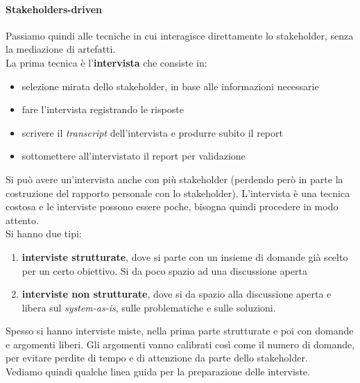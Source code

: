 \documentclass[a4paper,12pt, oneside]{book}
\begin{document}
\paragraph{Stakeholders-driven}
Passiamo quindi alle tecniche in cui interagisce direttamente lo stakeholder,
senza la mediazione di artefatti.\\
La prima tecnica è l'\textbf{intervista} che consiste in:
\begin{itemize}
  \item selezione mirata dello stakeholder, in base alle informazioni necessarie
  \item fare l'intervista registrando le risposte
  \item scrivere il \textit{transcript} dell'intervista e produrre subito il
  report
  \item sottomettere all'intervistato il report per validazione
\end{itemize}
Si può avere un'intervista anche con più stakeholder (perdendo però in parte la
costruzione del rapporto personale con lo stakeholder). L'intervista è una
tecnica costosa e le interviste possono essere poche, bisogna quindi procedere
in modo attento.\\
Si hanno due tipi:
\begin{enumerate}
  \item \textbf{interviste strutturate}, dove si parte con un insieme di domande
  già scelto per un certo obiettivo. Si da poco spazio ad una discussione aperta
  \item \textbf{interviste non strutturate}, dove si da spazio alla discussione
  aperta e libera sul \textit{system-as-is}, sulle problematiche e sulle
  soluzioni. 
\end{enumerate}
Spesso si hanno interviste miste, nella prima parte strutturate e poi con
domande e argomenti liberi. Gli argomenti vanno calibrati così come il numero di
domande, per evitare perdite di tempo e di attenzione da parte dello
stakeholder.\\
Vediamo quindi qualche linea guida per la preparazione delle interviste.
\end{document}
